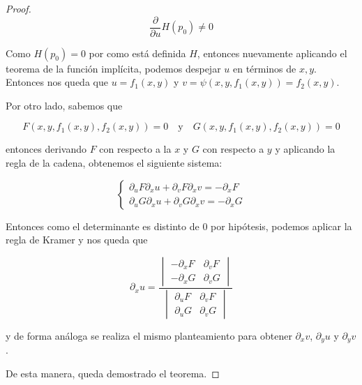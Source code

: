 \begin{proof}
    \[
    \frac{\partial}{\partial u} H(p_0) \neq 0
    \]
    
    Como $H(p_0) = 0$ por como está definida $H$, entonces nuevamente aplicando el teorema de la función implícita, podemos despejar $u$ en términos de $x, y$. Entonces nos queda que $u = f_1(x,y)$ y $v = \psi\left( x, y, f_1(x,y) \right) = f_2 (x,y)$.
    
    Por otro lado, sabemos que
    
    \[
    F(x,y,f_1(x,y),f_2(x,y)) = 0 \quad \text{y} \quad G(x,y,f_1(x,y),f_2(x,y)) = 0
    \]
    
    \noindent entonces derivando $F$ con respecto a la $x$ y $G$ con respecto a $y$ y aplicando la regla de la cadena, obtenemos el siguiente sistema:
    
    \[
    \begin{cases}
        \partial_uF \partial_xu + \partial_vF \partial_xv = -\partial_xF \\
        \partial_uG \partial_xu + \partial_vG \partial_xv = -\partial_xG
    \end{cases}
    \]
    
    Entonces como el determinante es distinto de $0$ por hipótesis, podemos aplicar la regla de Kramer y nos queda que
    
    \[
    \partial_xu =
    \dfrac{
        \begin{vmatrix}
            -\partial_xF & \partial_vF \\
            -\partial_xG & \partial_vG
        \end{vmatrix}
    }{
        \begin{vmatrix}
            \partial_uF & \partial_vF \\
            \partial_uG & \partial_vG
        \end{vmatrix}
    }
    \]
    
    \noindent y de forma análoga se realiza el mismo planteamiento para obtener $\partial_xv$, $\partial_yu$ y $\partial_yv$.
    
    De esta manera, queda demostrado el teorema.
\end{proof}
